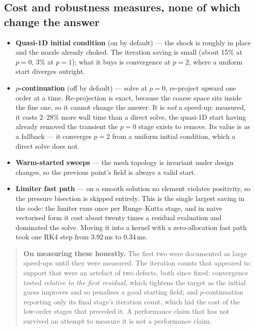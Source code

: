 \documentclass[11pt,a4paper]{article}
\begin{document}
\subsection{Cost and robustness measures, none of which change the answer}

\begin{itemize}\itemsep2pt
  \item \textbf{Quasi-1D initial condition} (on by default) --- the shock is
    roughly in place and the nozzle already choked.  The iteration saving is
    small (about 15\% at $p=0$, 3\% at $p=1$); what it buys is convergence at
    $p=2$, where a uniform start diverges outright.
  \item \textbf{$p$-continuation} (off by default) --- solve at $p=0$,
    re-project upward one order at a time.  Re-projection is exact, because the
    coarse space sits inside the fine one, so it cannot change the answer.  It is
    \emph{not} a speed-up: measured, it costs 2--28\% more wall time than a
    direct solve, the quasi-1D start having already removed the transient the
    $p=0$ stage exists to remove.  Its value is as a fallback --- it converges
    $p=2$ from a uniform initial condition, which a direct solve does not.
  \item \textbf{Warm-started sweeps} --- the mesh topology is invariant under
    design changes, so the previous point's field is always a valid start.
  \item \textbf{Limiter fast path} --- on a smooth solution no element violates
    positivity, so the pressure bisection is skipped entirely.  This is the
    single largest saving in the code: the limiter runs once per Runge--Kutta
    stage, and in naive vectorised form it cost about twenty times a residual
    evaluation and dominated the solve.  Moving it into a kernel with a
    zero-allocation fast path took one RK4 step from 3.92\,ms to 0.34\,ms.
\end{itemize}

\begin{quote}
\textbf{On measuring these honestly.}  The first two were documented as large
speed-ups until they were measured.  The iteration counts that appeared to
support that were an artefact of two defects, both since fixed: convergence
tested \emph{relative to the first residual}, which tightens the target as the
initial guess improves and so penalises a good starting field; and
$p$-continuation reporting only its final stage's iteration count, which hid the
cost of the low-order stages that preceded it.  A performance claim that has not
survived an attempt to measure it is not a performance claim.
\end{quote}
\end{document}
